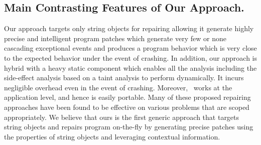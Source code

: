 \subsection{Main Contrasting Features of Our Approach.}
Our approach targets only string objects for repairing allowing it
generate highly precise and intelligent program patches which generate very few or none
cascading exceptional events and produces a program behavior which is very close
to the expected behavior under the event of crashing.
In addition, our approach is hybrid with a heavy static component which enables
all the analysis including the side-effect analysis based on a taint analysis to
perform dynamically. It incurs negligible overhead even in the event of
crashing. Moreover, \tool\ works at the application level, and hence is easily portable.
Many of these proposed repairing approaches have been found to be effective on
various problems that are scoped appropriately. We believe that ours is the first
generic approach that targets string objects and repairs program on-the-fly by
generating precise patches using the properties of string objects and leveraging contextual
information.
